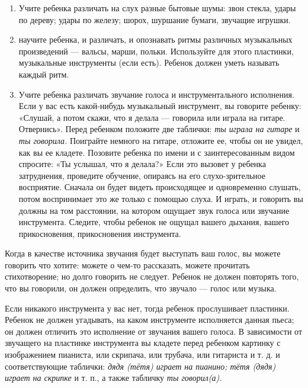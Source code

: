 \documentclass[a5paper]{book}
\renewcommand{\emph}[1]{\textit{#1}}
\begin{document}
\begin{enumerate}
\def\labelenumi{\arabic{enumi}.}
\item
  
  Учите ребенка различать на слух разные бытовые шумы: звон стекла,
  удары по дереву; удары по железу; шорох, шуршание бумаги, звучащие
  игрушки.
  
\item
  
  научите ребенка, и различать, и опознавать ритмы различных музыкальных
  произведений --- вальсы, марши, польки. Используйте для этого
  пластинки, музыкальные инструменты (если есть). Ребенок должен уметь
  называть каждый ритм.
  
\item
  
  Учите ребенка различать звучание голоса и инструментального
  исполнения. Если у вас есть какой-нибудь музыкальный инструмент, вы
  говорите ребенку: «Слушай, а потом скажи, что я делала --- говорила
  или играла на гитаре. Отвернись». Перед ребенком положите две
  таблички: \emph{ты играла на гитаре} и \emph{ты говорила.} Поиграйте
  немного на гитаре, отложите ее, чтобы он не увидел, как вы ее кладете.
  Позовите ребенка по имени и с заинтересованным видом спросите: «Ты
  услышал, что я делала?» Если это вызовет у ребенка затруднения,
  проведите обучение, опираясь на его слухо-зрительное восприятие.
  Сначала он будет видеть происходящее и одновременно слушать, потом
  воспринимает это же только с помощью слуха. И играть, и говорить вы
  должны на том расстоянии, на котором ощущает звук голоса или звучание
  инструмента. Следите, чтобы ребенок не ощущал вашего дыхания, вашего
  прикосновения, прикосновения инструмента.
  
\end{enumerate}


Когда в качестве источника звучания будет выступать ваш голос, вы можете
говорить что хотите: можете о чем-то рассказать, можете прочитать
стихотворение; но долго говорить не следует. Ребенок не должен повторять
того, что вы говорили, он должен определить, что звучало --- голос или
музыка.

Если никакого инструмента у вас нет, тогда ребенок прослушивает
пластинки. Ребенок не должен угадывать, на каком инструменте исполняется
данная пьеса; он должен отличить это исполнение от звучания вашего
голоса. В зависимости от звучащего на пластинке инструмента вы кладете
перед ребенком картинку с изображением пианиста, или скрипача, или
трубача, или гитариста и т. д. и соответствующие таблички: \emph{дядя
(тётя) играет на пианино; тётя (дядя) играет на скрипке} и т. п., а
также табличку \emph{ты говорил(а).}
\end{document}
